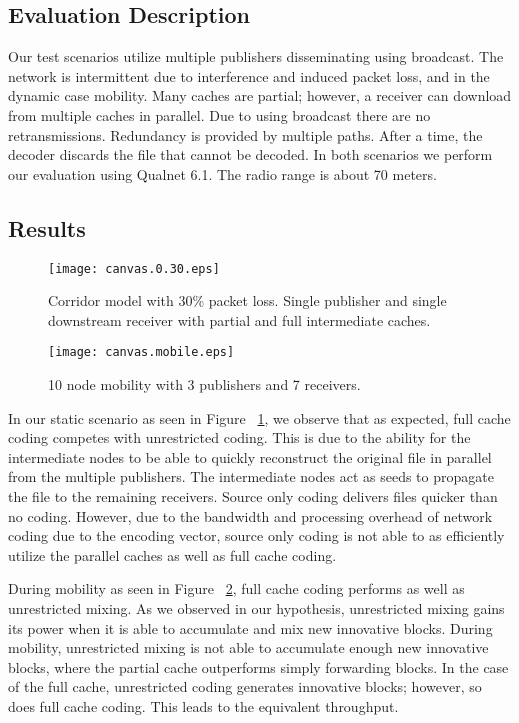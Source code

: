\subsection{Evaluation Description}
Our test scenarios utilize multiple publishers disseminating using broadcast. The network is intermittent due to interference and induced packet loss, and in the dynamic case mobility. Many caches are partial; however, a receiver can download from multiple caches in parallel. Due to using broadcast there are no retransmissions. Redundancy is provided by multiple paths. After a time, the decoder discards the file that cannot be decoded. In both scenarios we perform our evaluation using Qualnet 6.1. The radio range is about 70 meters.

\subsection{Results}

\begin{figure}[t]
\texttt{[image: canvas.0.30.eps]}
\caption{Corridor model with 30\% packet loss. Single publisher and single downstream receiver with partial and full intermediate caches.}
\label{fig:static}
\end{figure}

\begin{figure}[t]
\texttt{[image: canvas.mobile.eps]}
\caption{10 node mobility with 3 publishers and 7 receivers.}
\label{fig:mobile}
\end{figure}




In our static scenario as seen in Figure ~\ref{fig:static}, we observe that as expected, full cache coding competes with unrestricted coding. This is due to the ability for the intermediate nodes to be able to quickly reconstruct the original file in parallel from the multiple publishers. The intermediate nodes act as seeds to propagate the file to the remaining receivers. Source only coding delivers files quicker than no coding. However, due to the bandwidth and processing overhead of network coding due to the encoding vector, source only coding is not able to as efficiently utilize the parallel caches as well as full cache coding.

During mobility as seen in Figure ~\ref{fig:mobile}, full cache coding performs as well as unrestricted mixing. As we observed in our hypothesis, unrestricted mixing gains its power when it is able to accumulate and mix new innovative blocks. During mobility, unrestricted mixing is not able to accumulate enough new innovative blocks, where the partial cache outperforms simply forwarding blocks. In the case of the full cache, unrestricted coding generates innovative blocks; however, so does full cache coding. This leads to the equivalent throughput.

